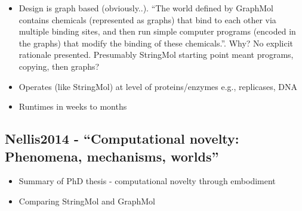 \begin{itemize}
			\item
			
			Design is graph based (obviously..). ``The world defined by GraphMol
			contains chemicals (represented as graphs) that bind to each other via
			multiple binding sites, and then run simple computer programs (encoded
			in the graphs) that modify the binding of these chemicals.''. Why? No
			explicit rationale presented. Presumably StringMol starting point
			meant programs, copying, then graphs?
			
			\item
			
			Operates (like StringMol) at level of proteins/enzymes e.g.,
			replicases, DNA
			
			\item
			
			Runtimes in weeks to months
			
		\end{itemize}
		
		\hypertarget{nellis2014---computational-novelty-phenomena-mechanisms-worlds}{\subsection{Nellis2014
				- ``Computational novelty: Phenomena, mechanisms,
				worlds''}\label{nellis2014---computational-novelty-phenomena-mechanisms-worlds}}
		
		\begin{itemize}
			\item
			
			Summary of PhD thesis - computational novelty through embodiment
			
			\item
			
			Comparing StringMol and GraphMol
			
		\end{itemize}
		
